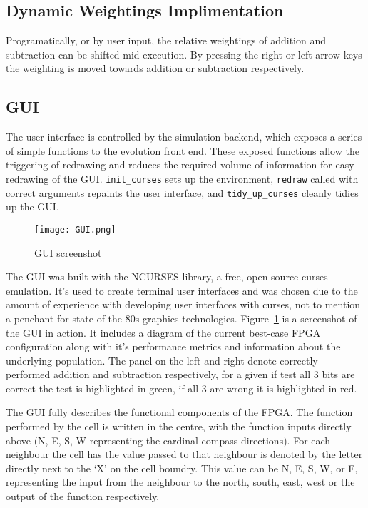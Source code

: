 \subsection{Dynamic Weightings Implimentation}
Programatically, or by user input, the relative weightings of addition and subtraction
can be shifted mid-execution. By pressing the right or left arrow keys the weighting
is moved towards addition or subtraction respectively.

\subsection{GUI}
The user interface is controlled by the simulation backend, which exposes a
series of simple functions to the evolution front end. These exposed functions
allow the triggering of redrawing and reduces the required volume of information
for easy redrawing of the GUI. \texttt{init\_curses} sets up the environment,
\texttt{redraw} called with correct arguments repaints the user interface, and
\texttt{tidy\_up\_curses} cleanly tidies up the GUI.

\begin{figure}
\texttt{[image: GUI.png]}
\caption{GUI screenshot}
\label{fig:gui}
\end{figure}

The GUI was built with the NCURSES library, a free, open source curses emulation.
It's used to create terminal user interfaces and was chosen due to the amount of
experience  with developing user interfaces with curses, not to
mention a penchant for state-of-the-80s graphics technologies.
Figure~\ref{fig:gui} is a screenshot of the GUI in action. It includes a diagram
of the current best-case FPGA configuration along with it's performance metrics
and information about the underlying population. The panel on the left and right
denote correctly performed addition and subtraction respectively, for a given
if test all 3 bits are correct the test is highlighted in green, if all 3 are wrong
it is highlighted in red.

The GUI fully describes the functional components of the FPGA. The function performed
by the cell is written in the centre, with the function inputs directly above
(N, E, S, W representing the cardinal compass directions). For each neighbour the
cell has the value passed to that neighbour is denoted by the letter directly
next to the `X' on the cell boundry. This value can be N, E, S, W, or F, representing the input from the
neighbour to the north, south, east, west or the output of the function respectively.

